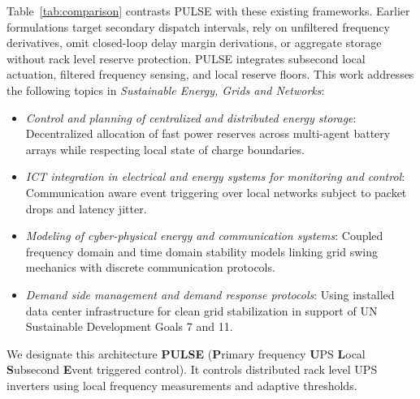 \documentclass[preprint,12pt]{elsarticle}
\begin{document}
Table~\ref{tab:comparison} contrasts PULSE with these existing frameworks. Earlier formulations target secondary dispatch intervals, rely on unfiltered frequency derivatives, omit closed-loop delay margin derivations, or aggregate storage without rack level reserve protection. PULSE integrates subsecond local actuation, filtered frequency sensing, and local reserve floors. This work addresses the following topics in \textit{Sustainable Energy, Grids and Networks}:
\begin{itemize}
    \item \textit{Control and planning of centralized and distributed energy storage}: Decentralized allocation of fast power reserves across multi-agent battery arrays while respecting local state of charge boundaries.
    \item \textit{ICT integration in electrical and energy systems for monitoring and control}: Communication aware event triggering over local networks subject to packet drops and latency jitter.
    \item \textit{Modeling of cyber-physical energy and communication systems}: Coupled frequency domain and time domain stability models linking grid swing mechanics with discrete communication protocols.
    \item \textit{Demand side management and demand response protocols}: Using installed data center infrastructure for clean grid stabilization in support of UN Sustainable Development Goals 7 and 11.
\end{itemize}
We designate this architecture \textbf{PULSE} (\textbf{P}rimary frequency \textbf{U}PS \textbf{L}ocal \textbf{S}ubsecond \textbf{E}vent triggered control). It controls distributed rack level UPS inverters using local frequency measurements and adaptive thresholds.
\end{document}
